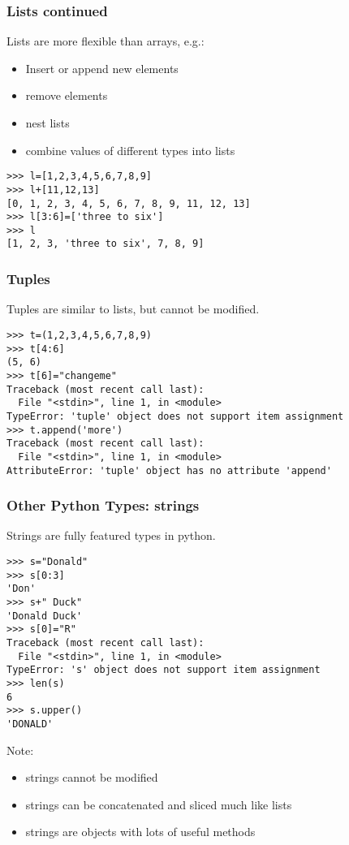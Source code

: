 \documentclass[10pt]{beamer}
\begin{document}
\begin{frame}[fragile]
\frametitle{Lists continued}

Lists are more flexible than arrays, e.g.:
\begin{itemize}
\item Insert or append new elements
\item remove elements
\item nest lists
\item combine values of different types into lists
\end{itemize}

\begin{verbatim}
>>> l=[1,2,3,4,5,6,7,8,9]
>>> l+[11,12,13]
[0, 1, 2, 3, 4, 5, 6, 7, 8, 9, 11, 12, 13]
>>> l[3:6]=['three to six']
>>> l
[1, 2, 3, 'three to six', 7, 8, 9]
\end{verbatim}

\end{frame}

\begin{frame}[fragile]
\frametitle{Tuples}

Tuples are similar to lists, but cannot be modified.
\begin{verbatim}
>>> t=(1,2,3,4,5,6,7,8,9)
>>> t[4:6]
(5, 6)
>>> t[6]="changeme"
Traceback (most recent call last):
  File "<stdin>", line 1, in <module>
TypeError: 'tuple' object does not support item assignment
>>> t.append('more')
Traceback (most recent call last):
  File "<stdin>", line 1, in <module>
AttributeError: 'tuple' object has no attribute 'append'
\end{verbatim}
\end{frame}

\begin{frame}[fragile]
\frametitle{Other Python Types: strings}

Strings are fully featured types in python.

\begin{verbatim}
>>> s="Donald"
>>> s[0:3]
'Don'
>>> s+" Duck"
'Donald Duck'
>>> s[0]="R"
Traceback (most recent call last):
  File "<stdin>", line 1, in <module>
TypeError: 's' object does not support item assignment
>>> len(s)
6
>>> s.upper()
'DONALD'
\end{verbatim}

Note:
\begin{itemize}
\item strings cannot be modified
\item strings can be concatenated and sliced much like lists
\item strings are objects with lots of useful methods
\end{itemize}

\end{frame}
\end{document}
